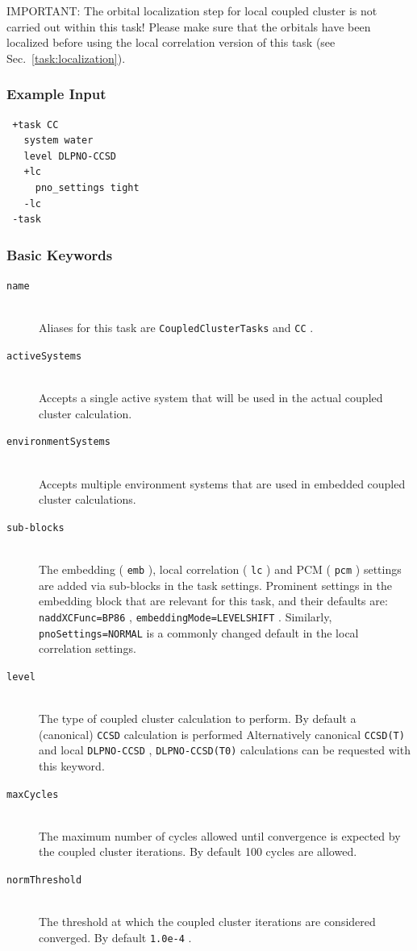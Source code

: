 \documentclass[bibliography=totocnumbered,a4paper,10pt,oneside]{scrbook}
\newcommand{\ttt}[1]{%
  \begingroup\setlength{\fboxsep}{1pt}%
  \colorbox{serenity-green!30}{\texttt{\hspace*{2pt}\vphantom{(g}#1\hspace*{2pt}}}%
  \endgroup
}
\begin{document}
{\color{red}IMPORTANT:} The orbital localization step for local coupled cluster is not carried out
within this task! Please make sure that the orbitals have been localized before using the local
correlation version of this task (see Sec.~\ref{task:localization}).
\subsubsection{Example Input}
\begin{lstlisting}
 +task CC
   system water
   level DLPNO-CCSD
   +lc
     pno_settings tight
   -lc
 -task
\end{lstlisting}
\subsubsection{Basic Keywords}
\begin{description}
 \item [\texttt{name}]\hfill \\
   Aliases for this task are \ttt{CoupledClusterTasks} and \ttt{CC}.
 \item [\texttt{activeSystems}]\hfill \\
   Accepts a single active system that will be used in the actual coupled cluster calculation.
 \item [\texttt{environmentSystems}]\hfill \\
   Accepts multiple environment systems that are used in embedded coupled cluster calculations.
 \item [\texttt{sub-blocks}]\hfill \\
   The embedding (\ttt{emb}), local correlation (\ttt{lc}) and PCM (\ttt{pcm}) settings are added via sub-blocks in the task settings.
   Prominent settings in the embedding block that are relevant for this task, and their defaults are:
   \ttt{naddXCFunc=BP86}, \ttt{embeddingMode=LEVELSHIFT}.
   Similarly, \ttt{pnoSettings=NORMAL} is a commonly changed default in the local correlation settings.
 \item [\texttt{level}]\hfill \\
   The type of coupled cluster calculation to perform. By default a (canonical) \ttt{CCSD} calculation is performed
   Alternatively canonical \ttt{CCSD(T)} and local \ttt{DLPNO-CCSD}, \ttt{DLPNO-CCSD(T0)} calculations can be
   requested with this keyword.
 \item [\texttt{maxCycles}]\hfill \\
   The maximum number of cycles allowed until convergence is expected by the coupled cluster iterations.
   By default 100 cycles are allowed.
 \item [\texttt{normThreshold}]\hfill \\
   The threshold at which the coupled cluster iterations are considered converged. By default \ttt{1.0e-4}.
\end{description}
\end{document}
